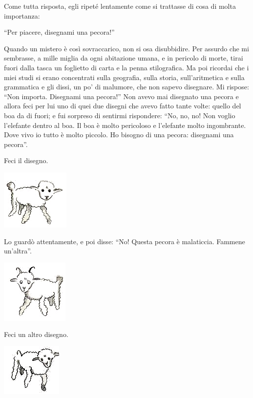 \documentclass[11pt]{scrbook}
\begin{document}
Come tutta risposta, egli ripeté lentamente come si trattasse di cosa di molta importanza:

``Per piacere, disegnami una pecora!''

Quando un mistero è così sovraccarico, non si osa disubbidire. Per assurdo che mi sembrasse, a mille miglia da ogni abitazione umana, e in pericolo di morte, tirai fuori dalla tasca un foglietto di carta e la penna stilografica. Ma poi ricordai che i miei studi si erano concentrati sulla geografia, sulla storia, sull'aritmetica e sulla grammatica e gli dissi, un po' di malumore, che non sapevo disegnare. Mi rispose: ``Non importa. Disegnami una pecora!'' Non avevo mai disegnato una pecora e allora feci per lui uno di quei due disegni che avevo fatto tante volte: quello del boa da di fuori; e fui sorpreso di sentirmi rispondere: ``No, no, no! Non voglio l'elefante dentro al boa. Il boa è molto pericoloso e l'elefante molto ingombrante. Dove vivo io tutto è molto piccolo. Ho bisogno di una pecora: disegnami una pecora''.

Feci il disegno.

\begin{center}
\includegraphics{img/2b}
\end{center}

Lo guardò attentamente, e poi disse: ``No! Questa pecora è malaticcia. Fammene un'altra''.

\begin{center}
\includegraphics{img/2c}
\end{center}

Feci un altro disegno.

\begin{center}
\includegraphics{img/2d}
\end{center}
\end{document}
